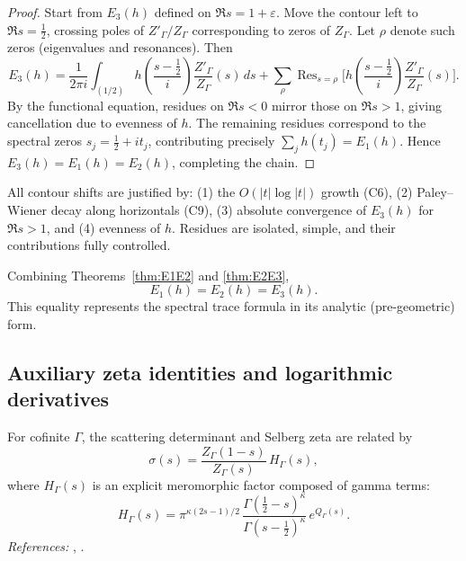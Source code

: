 \begin{proof}\relax
Start from $E_3(h)$ defined on $\Re s=1+\varepsilon$. Move the contour left to $\Re s=\tfrac12$, crossing poles of $Z'_\Gamma/Z_\Gamma$ corresponding to zeros of $Z_\Gamma$. Let $\rho$ denote such zeros (eigenvalues and resonances). Then
\[
E_3(h)
= \frac{1}{2\pi i}\int_{(1/2)}h\!\left(\frac{s-\tfrac12}{i}\right)\frac{Z'_\Gamma}{Z_\Gamma}(s)\,ds
+ \sum_{\rho} \operatorname{Res}_{s=\rho} \Big[h\!\left(\frac{s-\tfrac12}{i}\right)\frac{Z'_\Gamma}{Z_\Gamma}(s)\Big].
\]
By the functional equation, residues on $\Re s<0$ mirror those on $\Re s>1$, giving cancellation due to evenness of $h$. The remaining residues correspond to the spectral zeros $s_j=\tfrac12+it_j$, contributing precisely $\sum_j h(t_j)=E_1(h)$. Hence $E_3(h)=E_1(h)=E_2(h)$, completing the chain. \relax
\end{proof}

\begin{invariant}
\label{inv:C11}
All contour shifts are justified by:  
(1) the $O(|t|\log|t|)$ growth (C6),  
(2) Paley–Wiener decay along horizontals (C9),  
(3) absolute convergence of $E_3(h)$ for $\Re s>1$, and  
(4) evenness of $h$.  
Residues are isolated, simple, and their contributions fully controlled. \relax
\end{invariant}

\begin{corollary}
\label{cor:spectral-complete}
Combining Theorems~\ref{thm:E1E2} and \ref{thm:E2E3},
\[
E_1(h)=E_2(h)=E_3(h).
\]
This equality represents the spectral trace formula in its analytic (pre-geometric) form. \relax
\end{corollary}

\subsection{Auxiliary zeta identities and logarithmic derivatives}
\label{subsec:ch4-part4-auxiliary} \relax

\begin{lemma}
\label{lem:scattering-zeta}
For cofinite $\Gamma$, the scattering determinant and Selberg zeta are related by
\[
\sigma(s) = \frac{Z_\Gamma(1-s)}{Z_\Gamma(s)}\,H_\Gamma(s),
\]
where $H_\Gamma(s)$ is an explicit meromorphic factor composed of gamma terms:
\[
H_\Gamma(s)=\pi^{\kappa(2s-1)/2}\,
\frac{\Gamma(\tfrac12-s)^\kappa}{\Gamma(s-\tfrac12)^\kappa}\,
e^{Q_\Gamma(s)}.
\]
\emph{References:} \cite[§9.4]{Hejhal1983vol2}, \cite{Selberg1956}. \relax
\end{lemma}

